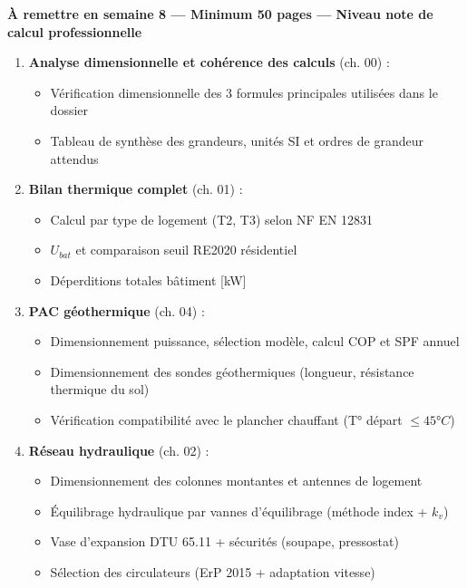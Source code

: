 \begin{methode}
\textbf{À remettre en semaine 8 — Minimum 50 pages — Niveau note de calcul professionnelle}

\begin{enumerate}
  \item \textbf{Analyse dimensionnelle et cohérence des calculs} (ch. 00) :
    \begin{itemize}
      \item Vérification dimensionnelle des 3 formules principales utilisées dans le dossier
      \item Tableau de synthèse des grandeurs, unités SI et ordres de grandeur attendus
    \end{itemize}

  \item \textbf{Bilan thermique complet} (ch. 01) :
    \begin{itemize}
      \item Calcul par type de logement (T2, T3) selon NF EN 12831
      \item $U_{bat}$ et comparaison seuil RE2020 résidentiel
      \item Déperditions totales bâtiment [\si{\kilo\watt}]
    \end{itemize}

  \item \textbf{PAC géothermique} (ch. 04) :
    \begin{itemize}
      \item Dimensionnement puissance, sélection modèle, calcul COP et SPF annuel
      \item Dimensionnement des sondes géothermiques (longueur, résistance thermique du sol)
      \item Vérification compatibilité avec le plancher chauffant (T° départ $\leq 45°C$)
    \end{itemize}

  \item \textbf{Réseau hydraulique} (ch. 02) :
    \begin{itemize}
      \item Dimensionnement des colonnes montantes et antennes de logement
      \item Équilibrage hydraulique par vannes d'équilibrage (méthode index + $k_{v}$)
      \item Vase d'expansion DTU 65.11 + sécurités (soupape, pressostat)
      \item Sélection des circulateurs (ErP 2015 + adaptation vitesse)
    \end{itemize}


\end{enumerate}
\end{methode}
